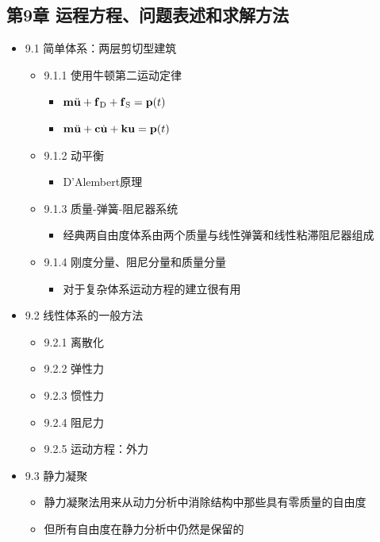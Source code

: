 \documentclass[11pt]{article}
\begin{document}
\subsection*{第9章 运程方程、问题表述和求解方法}
\label{sec:orgd65d519}
\begin{itemize}
\item 9.1 简单体系：两层剪切型建筑
\label{sec:orgcbf578d}
\begin{itemize}
\item 9.1.1 使用牛顿第二运动定律
\label{sec:org5eb25c2}
\begin{itemize}
\item \(\bm{\mathrm{m}} \ddot{\bm{\mathrm{u}}} + \bm{\mathrm{f}}_{\mathrm{D}} + \bm{\mathrm{f}}_{\mathrm{S}} = \bm{\mathrm{p}}(t)\)
\item \(\bm{\mathrm{m}} \ddot{\bm{\mathrm{u}}} + \bm{\mathrm{c}}\dot{\bm{\mathrm{u}}} + \bm{\mathrm{k}} \bm{\mathrm{u}} = \bm{\mathrm{p}}(t)\)
\end{itemize}
\item 9.1.2 动平衡
\label{sec:org74172c8}
\begin{itemize}
\item D'Alembert原理
\end{itemize}
\item 9.1.3 质量-弹簧-阻尼器系统
\label{sec:org6721fe0}
\begin{itemize}
\item 经典两自由度体系由两个质量与线性弹簧和线性粘滞阻尼器组成
\end{itemize}
\item 9.1.4 刚度分量、阻尼分量和质量分量
\label{sec:org64577d0}
\begin{itemize}
\item 对于复杂体系运动方程的建立很有用
\end{itemize}
\end{itemize}
\item 9.2 线性体系的一般方法
\label{sec:orgaa46eba}
\begin{itemize}
\item 9.2.1 离散化
\label{sec:org2fa0158}
\item 9.2.2 弹性力
\label{sec:org82637e9}
\item 9.2.3 惯性力
\label{sec:orgaa9c3f0}
\item 9.2.4 阻尼力
\label{sec:orgf8edd3a}
\item 9.2.5 运动方程：外力
\label{sec:org8d5862b}
\end{itemize}
\item 9.3 静力凝聚
\label{sec:org58639a9}
\begin{itemize}
\item 静力凝聚法用来从动力分析中消除结构中那些具有零质量的自由度
\item 但所有自由度在静力分析中仍然是保留的

\end{itemize}
\end{itemize}
\end{document}
